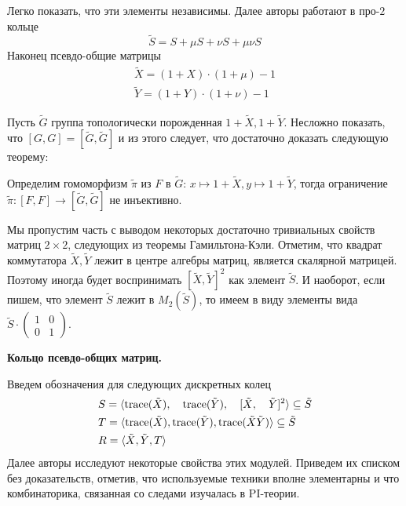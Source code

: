 Легко показать, что эти элементы независимы.
Далее авторы работают в про-$2$ кольце
\[
    \tilde{S} = S + \mu S + \nu S + \mu \nu S
\]
Наконец псевдо-общие матрицы
\begin{gather*}
    \tilde{X} = (1 + X) \cdot (1 + \mu) - 1 \\
    \tilde{Y} = (1 + Y) \cdot (1 + \nu) - 1
\end{gather*}

Пусть $\tilde{G}$ группа топологически порожденная $1 + \tilde{X}, 1 + \tilde{Y}$.
Несложно показать, что $[G, G] = [\tilde{G}, \tilde{G}]$ и из этого следует, что достаточно доказать следующую теорему:
\vskip 0.1in\noindent
\begin{theorem}
    Определим гомоморфизм $\tilde{\pi}$ из $F$ в $\tilde{G}$: $x\mapsto 1 + \tilde{X}, y\mapsto 1 + \tilde{Y}$, тогда ограничение $\tilde{\pi}: [F, F] \to [\tilde{G}, \tilde{G}]$ не инъективно.
\end{theorem}
\vskip 0.1in\noindent

Мы пропустим часть с выводом некоторых достаточно тривиальных свойств матриц $2\times 2$, следующих из теоремы Гамильтона-Кэли.
Отметим, что квадрат коммутатора $\tilde{X}, \tilde{Y}$ лежит в центре алгебры матриц, является скалярной матрицей.
Поэтому иногда будет воспринимать $[\tilde{X},\tilde{Y}]^2$ как элемент $\tilde{S}$.
И наоборот, если пишем, что элемент $\tilde{S}$ лежит в $M_2(\tilde{S})$, то имеем в виду элементы вида $\tilde{S} \cdot
\begin{pmatrix}
    1 & 0 \\
    0 & 1
\end{pmatrix}$.

\vskip 0.1in\noindent
{\large\textbf{Кольцо псевдо-общих матриц.}}

Введем обозначения для следующих дискретных колец
\begin{align*}
    & S = \langle \mathrm{trace}(\tilde{X}),\quad \mathrm{trace}(\tilde{Y}),\quad [\tilde{X},\quad \tilde{Y}]^2 \rangle \subseteq \tilde{S} \\
    & T = \langle \mathrm{trace}(\tilde{X}), \mathrm{trace}(\tilde{Y}), \mathrm{trace}(\tilde{X}\tilde{Y}) \rangle \subseteq \tilde{S} \\
    & R = \langle \tilde{X}, \tilde{Y}, T \rangle
\end{align*}
Далее авторы исследуют некоторые свойства этих модулей.
Приведем их списком без доказательств, отметив, что используемые техники вполне элементарны и что комбинаторика, связанная со следами изучалась в PI-теории.

